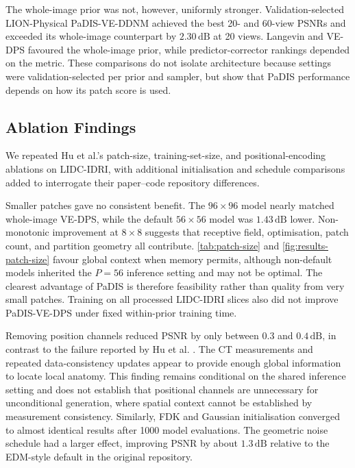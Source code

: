The whole-image prior was not, however, uniformly stronger. Validation-selected LION-Physical PaDIS-VE-DDNM achieved the best 20- and 60-view PSNRs and exceeded its whole-image counterpart by $2.30\,\mathrm{dB}$ at 20 views. Langevin and VE-DPS favoured the whole-image prior, while predictor-corrector rankings depended on the metric. These comparisons do not isolate architecture because settings were validation-selected per prior and sampler, but show that PaDIS performance depends on how its patch score is used.

\subsection{Ablation Findings}

We repeated Hu et al.'s patch-size, training-set-size, and positional-encoding ablations \cite{hu_learning_2024} on LIDC-IDRI, with additional initialisation and schedule comparisons added to interrogate their paper--code repository differences.

Smaller patches gave no consistent benefit. The $96\times96$ model nearly matched whole-image VE-DPS, while the default $56\times56$ model was $1.43\,\mathrm{dB}$ lower. Non-monotonic improvement at $8\times8$ suggests that receptive field, optimisation, patch count, and partition geometry all contribute. \autoref{tab:patch-size} and \autoref{fig:results-patch-size} favour global context when memory permits, although non-default models inherited the $P=56$ inference setting and may not be optimal. The clearest advantage of PaDIS is therefore feasibility rather than quality from very small patches. Training on all processed LIDC-IDRI slices also did not improve PaDIS-VE-DPS under fixed within-prior training time.

Removing position channels reduced PSNR by only between $0.3$ and $0.4\,\mathrm{dB}$, in contrast to the failure reported by Hu et al. \cite{hu_learning_2024}. The CT measurements and repeated data-consistency updates appear to provide enough global information to locate local anatomy. This finding remains conditional on the shared inference setting and does not establish that positional channels are unnecessary for unconditional generation, where spatial context cannot be established by measurement consistency. Similarly, FDK and Gaussian initialisation converged to almost identical results after 1000 model evaluations. The geometric noise schedule had a larger effect, improving PSNR by about $1.3\,\mathrm{dB}$ relative to the EDM-style default in the original repository.

